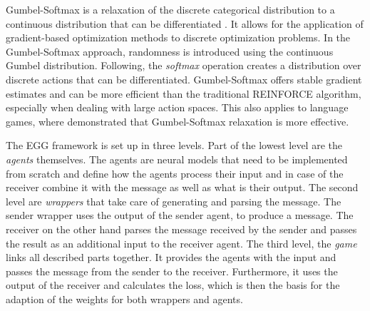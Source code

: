 Gumbel-Softmax is a relaxation of the discrete categorical distribution to a continuous distribution that can be differentiated \citep{Jang2016}.
It allows for the application of gradient-based optimization methods to discrete optimization problems.
In the Gumbel-Softmax approach, randomness is introduced using the continuous Gumbel distribution.
Following, the \emph{softmax} operation creates a distribution over discrete actions that can be differentiated.
Gumbel-Softmax offers stable gradient estimates and can be more efficient than the traditional REINFORCE algorithm, especially when dealing with large action spaces.
This also applies to language games, where \citet{Havrylov2017} demonstrated that Gumbel-Softmax relaxation is more effective.

The EGG framework is set up in three levels.
Part of the lowest level are the \emph{agents} themselves.
The agents are neural models that need to be implemented from scratch and define how the agents process their input and in case of the receiver combine it with the message as well as what is their output.
The second level are \emph{wrappers} that take care of generating and parsing the message.
The sender wrapper uses the output of the sender agent, to produce a message.
The receiver on the other hand parses the message received by the sender and passes the result as an additional input to the receiver agent.
The third level, the \emph{game} links all described parts together.
It provides the agents with the input and passes the message from the sender to the receiver.
Furthermore, it uses the output of the receiver and calculates the loss, which is then the basis for the adaption of the weights for both wrappers and agents.

